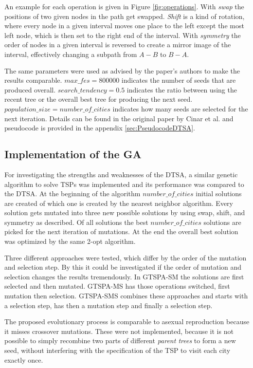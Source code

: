 \documentclass[12pt]{article}
\theoremstyle{plain}
\theoremstyle{definition}
\theoremstyle{remark}
\begin{document}
An example for each operation is given in Figure \ref{fig:operations}.
With \emph{swap} the positions of two given nodes in the path get swapped.
\emph{Shift} is a kind of rotation, where every node in a given interval moves one place to the left except the most left node, which is then set to the right end of the interval.
With \emph{symmetry} the order of nodes in a given interval is reversed to create a mirror image of the interval, effectively changing a subpath from $A-B$ to $B-A$.

The same parameters were used as advised by the paper's authors\cite{cinar20} to make the results comparable.
$max\_fes = 800000$ indicates the number of seeds that are produced overall.
$search\_tendency = 0.5$ indicates the ratio between using the recent tree or the overall best tree for producing the next seed.
$population\_size = number\_of\_cities$ indicates how many seeds are selected for the next iteration.
Details can be found in the original paper by Cinar et al.\cite{cinar20} and pseudocode is provided in the appendix \ref{sec:PseudocodeDTSA}.

\subsection{Implementation of the GA}
For investigating the strengths and weaknesses of the DTSA, a similar genetic algorithm to solve TSPs was implemented and its performance was compared to the DTSA.
At the beginning of the algorithm $number\_of\_cities$ initial solutions are created of which one is created by the nearest neighbor algorithm.
Every solution gets mutated into three new possible solutions by using  swap, shift, and symmetry as described.
Of all solutions the best $number\_of\_cities$ solutions are picked for the next iteration of mutations.
At the end the overall best solution was optimized by the same 2-opt algorithm.

Three different approaches were tested, which differ by the order of the mutation and selection step.
By this it could be investigated if the order of mutation and selection changes the results tremendously.
In GTSPA-SM the solutions are first selected and then mutated. GTSPA-MS has those operations switched, first mutation then selection.
GTSPA-SMS combines these approaches and starts with a selection step, has then a mutation step and finally a selection step.

The proposed evolutionary process is comparable to asexual reproduction because it misses crossover mutations.
These were not implemented, because it is not possible to simply recombine two parts of different \emph{parent trees} to form a new seed, without interfering with the specification of the TSP to visit each city exactly once.
\end{document}
